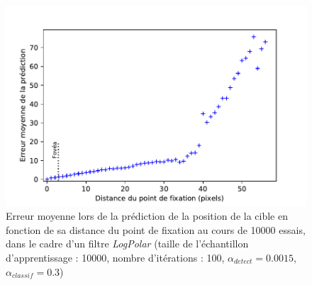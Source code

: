 \begin{figure}[th]
\centering
\includegraphics[scale=0.95]{Figures/logpolar_err_distance}
\decoRule
\caption[Figure]{Erreur moyenne lors de la prédiction de la position de la cible en fonction de sa distance du point de fixation au cours de 10000 essais, dans le cadre d'un filtre \textit{LogPolar} (taille de l'échantillon d'apprentissage :  10000, nombre d'itérations : 100, $\alpha_{detect}=0.0015$, $\alpha_{classif}=0.3$)}
\label{fig:err_distance}
\end{figure}